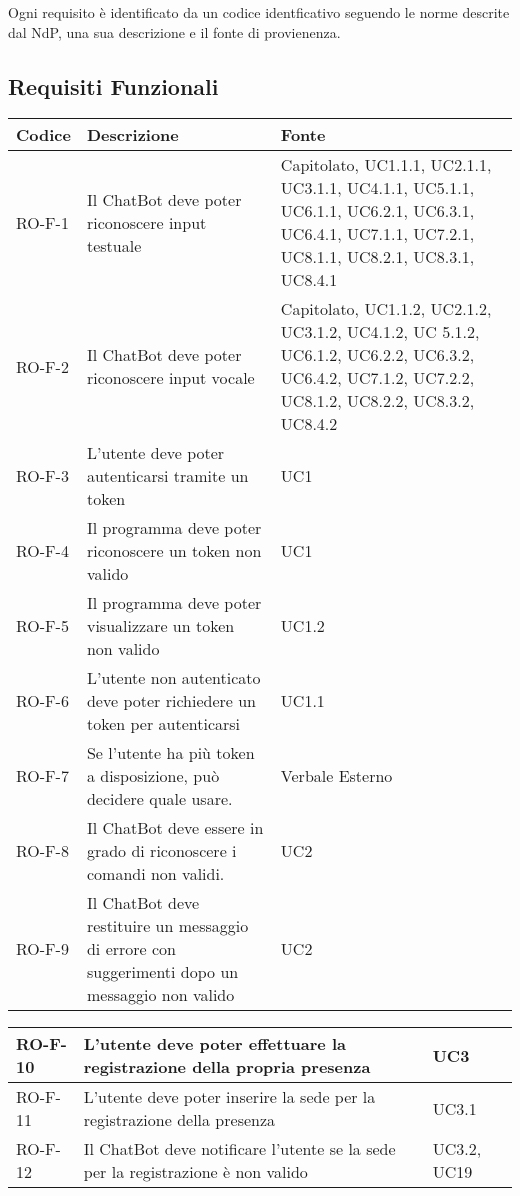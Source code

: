 Ogni requisito è identificato da un codice identficativo seguendo le norme descrite dal NdP, una sua descrizione e il fonte di provienenza.
\subsection{Requisiti Funzionali}
\begin{center}
\renewcommand{\arraystretch}{1.8} %
\begin{tabular}{ | m{8em} | m{18em} | m{12em} | }
\hline
Codice&Descrizione&Fonte\\
\hline
RO-F-1 & Il ChatBot deve poter riconoscere input testuale & Capitolato, UC1.1.1, UC2.1.1, UC3.1.1, UC4.1.1, UC5.1.1, UC6.1.1, UC6.2.1, UC6.3.1, UC6.4.1, UC7.1.1, UC7.2.1, UC8.1.1, UC8.2.1,  UC8.3.1, UC8.4.1\\
\hline
RO-F-2&Il ChatBot deve poter riconoscere input vocale&Capitolato, UC1.1.2, UC2.1.2, UC3.1.2, UC4.1.2, UC 5.1.2, UC6.1.2, UC6.2.2, UC6.3.2, UC6.4.2, UC7.1.2, UC7.2.2, UC8.1.2, UC8.2.2,  UC8.3.2, UC8.4.2\\
\hline
RO-F-3&L’utente deve poter autenticarsi tramite un token&UC1\\
\hline
RO-F-4&Il programma deve poter riconoscere un token non valido&UC1\\
\hline
RO-F-5&Il programma deve poter visualizzare un token non valido&UC1.2\\
\hline
RO-F-6&L’utente non autenticato deve poter richiedere un token per autenticarsi&UC1.1\\
\hline
RO-F-7&Se l’utente ha più token a disposizione, può decidere quale usare.&Verbale Esterno\\
\hline
RO-F-8&Il ChatBot deve essere in grado di riconoscere i comandi non validi.&UC2\\
\hline
RO-F-9&Il ChatBot deve restituire un messaggio di errore con suggerimenti dopo un messaggio non valido &UC2 \\
\hline
\end{tabular}
\newpage
\begin{tabular}{ | m{8em} | m{18em} | m{12em} | }
\hline
RO-F-10&L’utente deve poter effettuare la registrazione della propria presenza &UC3 \\
\hline
RO-F-11&L’utente deve poter inserire la sede per la registrazione della presenza &UC3.1 \\
\hline
RO-F-12&Il ChatBot deve notificare l’utente se la sede per la registrazione è non valido &UC3.2, UC19 \\

\end{tabular}
\end{center}
